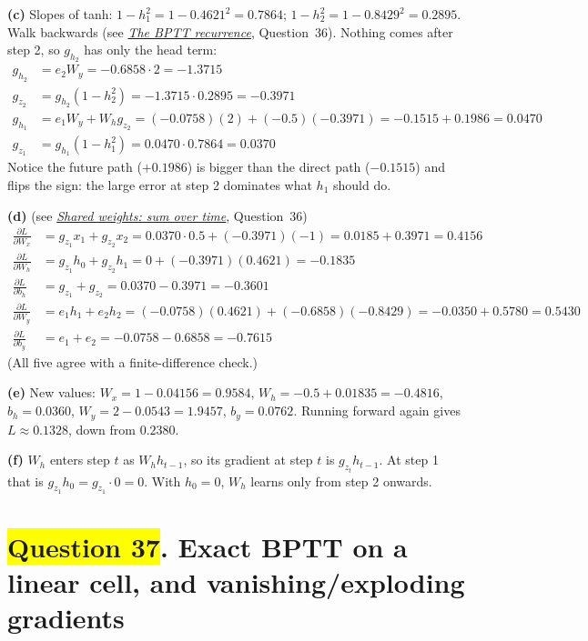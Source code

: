 \documentclass[12pt,a4paper]{article}
\newcommand{\seeconcept}[3]{(see \hyperref[#1]{\textit{#2}}, Question~#3)}
\newcommand{\hlq}[1]{{\setlength{\fboxsep}{1.5pt}\colorbox{yellow}{#1}}}
\begin{document}
\textbf{(c)} Slopes of tanh: $1-h_1^2=1-0.4621^2=0.7864$; $1-h_2^2=1-0.8429^2=0.2895$. Walk backwards \seeconcept{c:bpttrec}{The BPTT recurrence}{36}. Nothing comes after step 2, so $g_{h_2}$ has only the head term:
\begin{align*}
g_{h_2}&=e_2W_y=-0.6858\cdot2=-1.3715\\
g_{z_2}&=g_{h_2}(1-h_2^2)=-1.3715\cdot0.2895=-0.3971\\
g_{h_1}&=e_1W_y+W_hg_{z_2}=(-0.0758)(2)+(-0.5)(-0.3971)=-0.1515+0.1986=0.0470\\
g_{z_1}&=g_{h_1}(1-h_1^2)=0.0470\cdot0.7864=0.0370
\end{align*}
Notice the future path ($+0.1986$) is bigger than the direct path ($-0.1515$) and flips the sign: the large error at step 2 dominates what $h_1$ should do.

\textbf{(d)} \seeconcept{c:bpttweights}{Shared weights: sum over time}{36}
\begin{align*}
\frac{\partial L}{\partial W_x}&=g_{z_1}x_1+g_{z_2}x_2=0.0370\cdot0.5+(-0.3971)(-1)=0.0185+0.3971=0.4156\\
\frac{\partial L}{\partial W_h}&=g_{z_1}h_0+g_{z_2}h_1=0+(-0.3971)(0.4621)=-0.1835\\
\frac{\partial L}{\partial b_h}&=g_{z_1}+g_{z_2}=0.0370-0.3971=-0.3601\\
\frac{\partial L}{\partial W_y}&=e_1h_1+e_2h_2=(-0.0758)(0.4621)+(-0.6858)(-0.8429)=-0.0350+0.5780=0.5430\\
\frac{\partial L}{\partial b_y}&=e_1+e_2=-0.0758-0.6858=-0.7615
\end{align*}
(All five agree with a finite-difference check.)

\textbf{(e)} New values: $W_x=1-0.04156=0.9584$, $W_h=-0.5+0.01835=-0.4816$, $b_h=0.0360$, $W_y=2-0.0543=1.9457$, $b_y=0.0762$. Running forward again gives $L\approx0.1328$, down from $0.2380$.

\textbf{(f)} $W_h$ enters step $t$ as $W_hh_{t-1}$, so its gradient at step $t$ is $g_{z_t}h_{t-1}$. At step 1 that is $g_{z_1}h_0=g_{z_1}\cdot0=0$. With $h_0=0$, $W_h$ learns only from step 2 onwards.

\section[Question 37. Exact BPTT on a linear cell, and vanishing/exploding gradients]{\hlq{Question 37}. Exact BPTT on a linear cell, and vanishing/exploding gradients}
\end{document}
